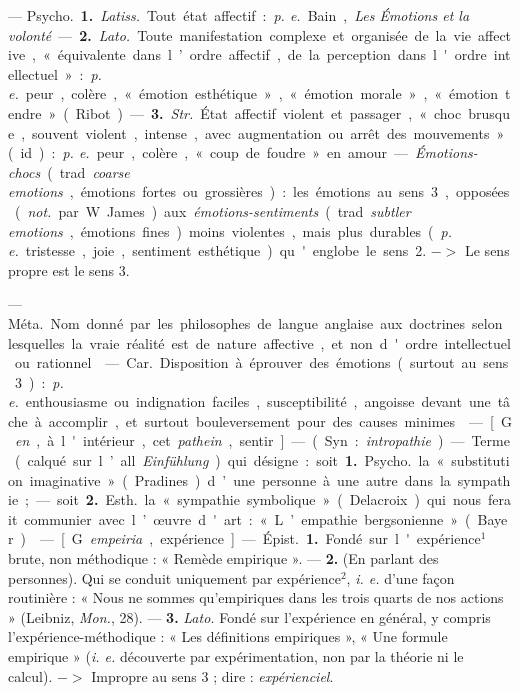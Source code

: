 \begin{itemize}[leftmargin=1cm, label=, itemsep=1pt]
 — \si{Psycho.} {\bf 1.} {\it Latiss.} Tout
état affectif : {\it p. e.} Bain, {\it Les Émotions
et la volonté}. — {\bf 2.} {\it Lato.} Toute manifestation complexe et organisée de la vie affective, « équivalente
dans l’ordre affectif, de la perception dans l'ordre intellectuel » :
{\it p. e.} peur, colère, « émotion esthétique », « émotion morale », « émotion tendre » (Ribot). — {\bf 3.} {\it Str.}
État affectif violent et passager,
« choc brusque, souvent violent,
intense, avec augmentation ou arrêt
des mouvements » (id.) : {\it p. e.} peur,
colère, « coup de foudre » en amour.
— {\it Émotions-chocs} (trad. {\it coarse emotions}, émotions fortes
ou grossières) : les émotions au sens 3, opposées
({\it not.} par W. James) aux {\it émotions-sentiments} (trad.
{\it subtler emotions}, émotions fines) moins violentes,
mais plus durables ({\it p. e.} tristesse,
joie, sentiment esthétique) qu'englobe le sens 2. $->$ Le sens propre
est le sens 3.

 —  \si{Méta.} Nom donné par les philosophes de
langue anglaise aux doctrines selon lesquelles la vraie réalité est de nature
affective, et non d'ordre intellectuel ou rationnel.

 — \si{Car.} Disposition à
éprouver des émotions (surtout au sens 3) : {\it p. e.} enthousiasme ou
indignation faciles, susceptibilité, angoisse devant une tâche à
accomplir, et surtout bouleversement pour des causes minimes.

 — [G. {\it en}, à l'intérieur, cet
{\it pathein}, sentir] — (Syn. : {\it intropathie}).
— Terme (calqué sur l’all. {\it Einfühlung}) qui désigne : soit
{\bf 1.} \si{Psycho.} la
« substitution imaginative » (Pradines) d’une personne à une autre
dans la sympathie; — soit {\bf 2.} \si{Esth.}
la « sympathie symbolique » (Delacroix) qui nous ferait communier
avec l’œuvre d'art : « L’empathie
bergsonienne » (Bayer).

 — [G. {\it empeiria}, expérience]
— \si{Épist.} {\bf 1.} Fondé sur l'expérience$^1$
brute, non méthodique : « Remède empirique ». — {\bf 2.} (En parlant des
personnes). Qui se conduit uniquement par expérience$^2$, {\it i. e.} d'une
façon routinière : « Nous ne sommes qu’empiriques dans les trois quarts
de nos actions » (Leibniz, {\it Mon.}, 28).
— {\bf 3.} {\it Lato.} Fondé sur l'expérience
en général, y compris l’expérience-méthodique : « Les définitions
empiriques », « Une formule empirique » ({\it i. e.} découverte par
expérimentation, non par la théorie ni le
calcul). $->$ Impropre au sens 3 ; dire : {\it expérienciel}.


\end{itemize}
